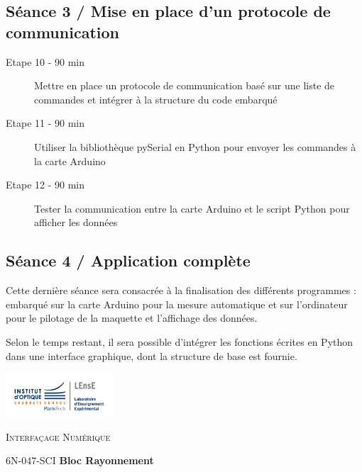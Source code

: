 \documentclass[a4paper,11pt,titlepage]{article} %
\begin{document}
\subsection{Séance 3 / Mise en place d'un protocole de communication}

	\begin{description}
		\item[Etape 10 - 90 min] Mettre en place un protocole de communication basé sur une liste de commandes et intégrer à la structure du code embarqué
		\item[Etape 11 - 90 min] Utiliser la bibliothèque pySerial en Python pour envoyer les commandes à la carte Arduino
		\item[Etape 12 - 90 min] Tester la communication entre la carte Arduino et le script Python pour afficher les données
	\end{description}

\medskip


\subsection{Séance 4 / Application complète}

Cette dernière séance sera consacrée à la finalisation des différents programmes : embarqué sur la carte Arduino pour la mesure automatique et sur l'ordinateur pour le pilotage de la maquette et l'affichage des données.

Selon le temps restant, il sera possible d'intégrer les fonctions écrites en Python dans une interface graphique, dont la structure de base est fournie.


\cleardoublepage
\strut %

\begin{minipage}[c]{.25\linewidth}
	\includegraphics[width=4cm]{images/Logo-LEnsE.png}
\end{minipage} \hfill
\begin{minipage}[c]{.4\linewidth}

\begin{center}
\vspace{0.3cm}
{\Large \textsc{Interfaçage Numérique}}

\medskip

6N-047-SCI \qquad \textbf{\large Bloc Rayonnement}

\end{center}
\end{minipage}\hfill
\end{document}
